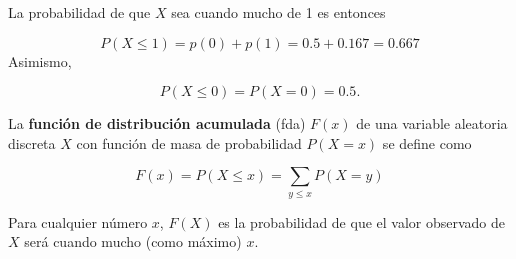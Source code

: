 \documentclass[
  11pt,
]{book}
\theoremstyle{definition}
\theoremstyle{definition}
\theoremstyle{definition}
\theoremstyle{definition}
\theoremstyle{remark}
\begin{document}
La probabilidad de que \(X\) sea cuando mucho de 1 es entonces

\[P(X \leq 1) = p(0) + p(1) = 0.5 + 0.167 = 0.667\]
Asimismo,

\[P(X \leq 0) = P(X = 0) = 0.5.\]

La \textbf{función de distribución acumulada} (fda) \(F(x)\) de una variable aleatoria discreta \(X\) con función de masa de probabilidad \(P(X=x)\) se define como

\begin{equation}
F(x) = P(X\leq x) =\displaystyle\sum_{y\leq x}P(X=y)
\label{eq:fdadiscreta}
\end{equation}

Para cualquier número \(x\), \(F(X)\) es la probabilidad de que el valor observado de \(X\) será cuando mucho (como máximo) \(x\). \citep[página 95]{Devore}
\end{document}
